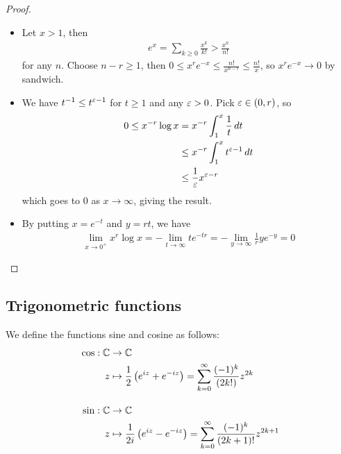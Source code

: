 \documentclass{../../template/note}
\begin{document}
    \begin{proof}
        \begin{itemize}
            \item Let \(x > 1\), then
            \begin{align*}
                e^x = \sum_{k\geq 0} \frac{x^k}{k!} > \frac{x^n}{n!}
            \end{align*}
            for any \(n\). Choose \(n-r \geq 1\), then \(0 \leq x^r e^{-x} \leq \frac{n!}{x^{n-r}} \leq \frac{n!}{x}\), so \(x^r e^{-x} \to 0\) by sandwich.         
            \item We have \(t^{-1} \leq t^{\varepsilon-1}\) for \(t \geq 1\) and any \(\varepsilon > 0\). Pick \(\varepsilon \in (0, r)\), so
            \begin{align*}
                0 \leq x^{-r} \log x &= x^{-r} \int_1^x \frac 1 t \,d{t}  
                \\
                &\leq x^{-r} \int_1^x t^{\varepsilon-1} \,d{t} \\
                &\leq \frac 1 {\varepsilon} x^{\varepsilon-r}
            \end{align*}
            which goes to 0 as \(x \to \infty\), giving the result.
            \item By putting \(x = e^{-t}\) and \(y=rt\), we have
            \begin{align*}
                \lim_{x \to 0^+} x^r \log x = -\lim_{t \to \infty} t e^{-tr} = -\lim_{y \to \infty} \frac 1 r ye^{-y} = 0
            \end{align*}
        \end{itemize}
    \end{proof}


    \subsection{Trigonometric functions}

    \begin{definition}
        We define the functions sine and cosine as follows:
        \begin{align*}
            \cos: \mathbb C &\to \mathbb C \\
            z &\mapsto \frac 1 2 \left(e^{iz}+e^{-iz}\right) = \sum_{k=0}^\infty \frac{(-1)^k}{(2k!)}z^{2k} \\[10pt]
            \sin: \mathbb C &\to \mathbb C \\
            z &\mapsto \frac 1 {2i} \left(e^{iz}-e^{-iz}\right) = \sum_{k=0}^\infty \frac{(-1)^k}{(2k+1)!}z^{2k+1}
        \end{align*}
    \end{definition}
    
\end{document}
